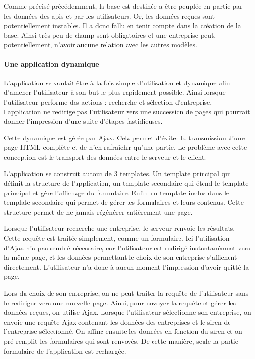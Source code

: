 \documentclass[french]{article}
\begin{document}
{Comme précisé précédemment, la base est destinée a être peuplée en partie par les données des apis et par les utilisateurs. Or, les données reçues sont potentiellement instables. Il a donc fallu en tenir compte dans la création de la base. Ainsi très peu de champ sont obligatoires et une entreprise peut, potentiellement, n'avoir aucune relation avec les autres modèles.

\paragraph{Une application dynamique}
L'application se voulait être à la fois simple d'utilisation et dynamique afin d'amener l'utilisateur à son but le plus rapidement possible. Ainsi lorsque l'utilisateur performe des actions : recherche et sélection d'entreprise, l'application ne redirige pas l'utilisateur vers une succession de pages qui pourrait donner l'impression d'une suite d'étapes fastidieuses.

Cette dynamique est gérée par Ajax. Cela permet d'éviter la transmission d'une page HTML complète et de n'en rafraîchir qu'une partie. Le problème avec cette conception est le transport des données entre le serveur et le client. 

L'application se construit autour de 3 templates. Un template principal qui définit la structure de l'application, un template secondaire qui étend le template principal et gère l'affichage du formulaire. Enfin un template inclus dans le template secondaire qui permet de gérer les formulaires et leurs contenus. Cette structure permet de ne jamais régénérer entièrement une page.

Lorsque l'utilisateur recherche une entreprise, le serveur renvoie les résultats. Cette requête est traitée simplement, comme un formulaire. Ici l'utilisation d'Ajax n'a pas semblé nécessaire, car l'utilisateur est redirigé instantanément vers la même page, et les données permettant le choix de son entreprise s'affichent directement. L'utilisateur n'a donc à aucun moment l'impression d'avoir quitté la page.

Lors du choix de son entreprise, on ne peut traiter la requête de l'utilisateur sans le rediriger vers une nouvelle page. Ainsi, pour envoyer la requête et gérer les données reçues, on utilise Ajax. Lorsque l'utilisateur sélectionne son entreprise, on envoie une requête Ajax contenant les données des entreprises et le siren de l'entreprise sélectionné. On affine ensuite les données en fonction du siren et on pré-remplit les formulaires qui sont renvoyés. De cette manière, seule la partie formulaire de l'application est rechargée.

}
\end{document}

